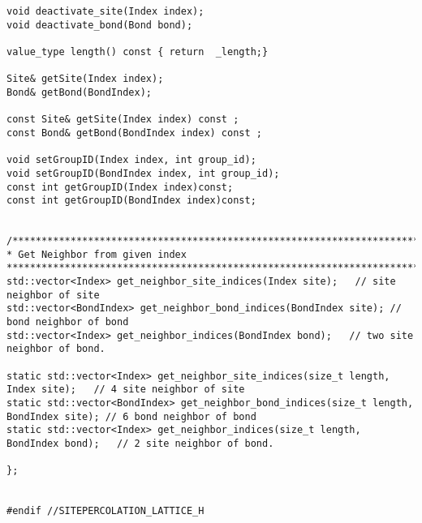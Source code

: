 \begin{lstlisting}[style=CStyle]
void deactivate_site(Index index);
void deactivate_bond(Bond bond);

value_type length() const { return  _length;}

Site& getSite(Index index);
Bond& getBond(BondIndex);

const Site& getSite(Index index) const ;
const Bond& getBond(BondIndex index) const ;

void setGroupID(Index index, int group_id);
void setGroupID(BondIndex index, int group_id);
const int getGroupID(Index index)const;
const int getGroupID(BondIndex index)const;


/******************************************************************************
* Get Neighbor from given index
******************************************************************************/
std::vector<Index> get_neighbor_site_indices(Index site);   // site neighbor of site
std::vector<BondIndex> get_neighbor_bond_indices(BondIndex site); // bond neighbor of bond
std::vector<Index> get_neighbor_indices(BondIndex bond);   // two site neighbor of bond.

static std::vector<Index> get_neighbor_site_indices(size_t length, Index site);   // 4 site neighbor of site
static std::vector<BondIndex> get_neighbor_bond_indices(size_t length, BondIndex site); // 6 bond neighbor of bond
static std::vector<Index> get_neighbor_indices(size_t length, BondIndex bond);   // 2 site neighbor of bond.

};


#endif //SITEPERCOLATION_LATTICE_H
\end{lstlisting}


